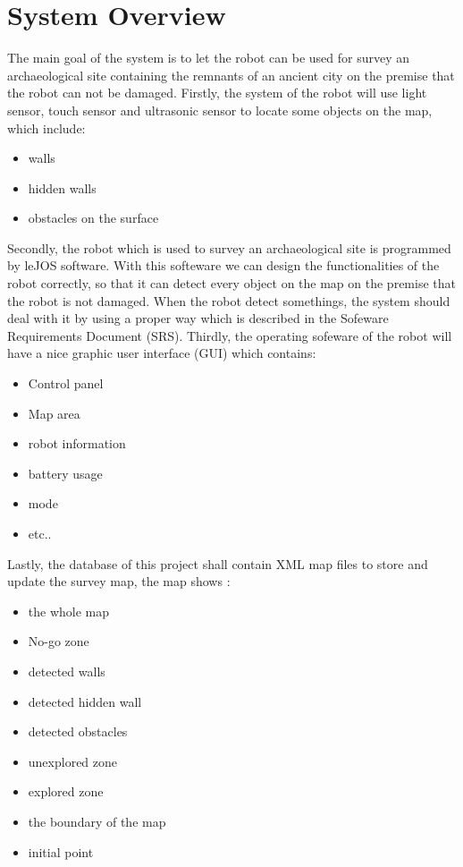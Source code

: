\documentclass[11pt, a4paper]{report}
\begin{document}
\chapter{System Overview}%
\label{cha:SO}
The main goal of the system is to let the robot can be used for survey an archaeological site containing the remnants of an ancient city on the premise that the robot can not be damaged.
\newline
\newline
 Firstly, the system of the robot will use light sensor, touch sensor and ultrasonic sensor to locate some objects on the map, which include:
\begin{itemize}
  \item walls
  \item hidden walls 
  \item obstacles on the surface
\end{itemize}
Secondly, the robot which is used to survey an archaeological site is programmed by leJOS software. With this softeware we can design the functionalities of the robot correctly, so that it can detect every object on the map on the premise that the robot is not damaged. When the robot detect somethings, the system should deal with it by using a proper way which is described in the Sofeware Requirements Document (SRS).
\newline
\newline
Thirdly, the operating sofeware of the robot will have a nice graphic user interface (GUI) which contains:
\begin{itemize}
  \item Control panel
  \item Map area
  \item robot information
  \item battery usage
  \item mode
  \item etc..
\end{itemize}
Lastly, the database of this project shall contain XML map files to store and update the survey map, the map shows :
\begin{itemize}
  \item the whole map
  \item No-go zone
  \item detected walls
  \item detected hidden wall
  \item detected obstacles
  \item unexplored zone
  \item explored zone
  \item the boundary of the map
  \item initial point
\end{itemize}
\end{document}
